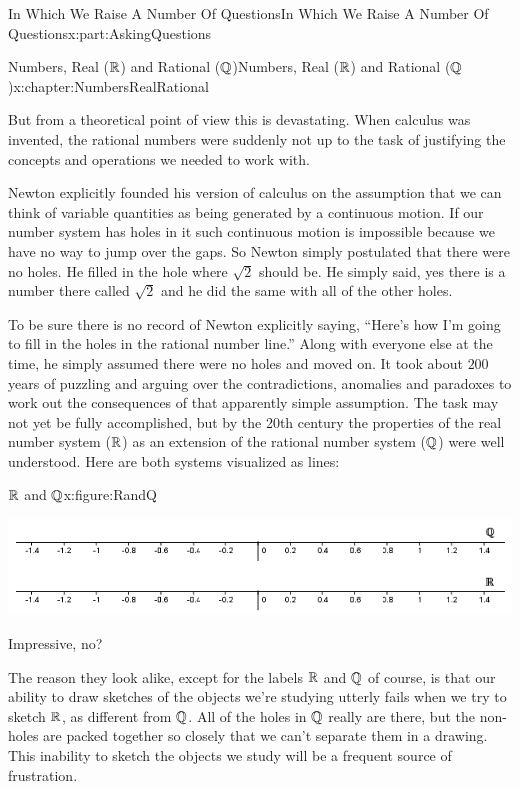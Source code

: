 \begin{partptx}{In Which We Raise A Number Of Questions}{}{In Which We Raise A Number Of Questions}{}{}{x:part:AskingQuestions}
\begin{chapterptx}{Numbers, Real (\(\mathbb {R}\)) and Rational (\(\mathbb {Q}\))}{}{Numbers, Real (\(\mathbb {R}\)) and Rational (\(\mathbb {Q}\))}{}{}{x:chapter:NumbersRealRational}
\begin{introduction}{}
			\par
			But from a theoretical point of view this is devastating. When calculus was invented, the rational numbers were suddenly not up to the task of justifying the concepts and operations we needed to work with.%
			\par
			Newton explicitly founded his version of calculus on the assumption that we can think of variable quantities as being generated by a continuous motion. If our number system has holes in it such continuous motion is impossible because we have no way to jump over the gaps. So Newton simply postulated that there were no holes. He filled in the hole where \(\sqrt{2}\) should be. He simply said, yes there is a number there called \(\sqrt{2}\) and he did the same with all of the other holes.%
			\par
			To be sure there is no record of Newton explicitly saying, ``Here's how I'm going to fill in the holes in the rational number line.'' Along with everyone else at the time, he simply assumed there were no holes and moved on. It took about \(200\) years of puzzling and arguing over the contradictions, anomalies and paradoxes to work out the consequences of that apparently simple assumption. The task may not yet be fully accomplished, but by the 20th century the properties of the real number system (\(\mathbb {R}\)) as an extension of the rational number system (\(\mathbb {Q}\)) were well understood. Here are both systems visualized as lines:%
			\begin{figureptx}{\(\mathbb {R}\) and \(\mathbb {Q}\)}{x:figure:RandQ}{}%
				\begin{image}{0}{1}{0}%
					\includegraphics[width=\linewidth]{external/images/RandQ.png}
				\end{image}%
				\tcblower
			\end{figureptx}%
			Impressive, no?%
			\par
			The reason they look alike, except for the labels \(\mathbb {R}\) and \(\mathbb {Q}\) of course, is that our ability to draw sketches of the objects we're studying utterly fails when we try to sketch \(\mathbb {R}\), as different from \(\mathbb {Q}\). All of the holes in \(\mathbb {Q}\) really are there, but the non-holes are packed together so closely that we can't separate them in a drawing. This inability to sketch the objects we study will be a frequent source of frustration.%

\end{introduction}
\end{chapterptx}
\end{partptx}
